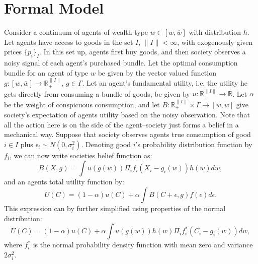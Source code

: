 \documentclass[a4paper,10pt]{article}
\begin{document}
\appendix
\section{Formal Model}
Consider a continuum of agents of wealth type $w\in[\underbar{w},\overline{w}]$ with distribution $h$.  Let agents have access to goods in the set $I$, $\|I\|<\infty$, with exogenously given prices $\{p_i\}_I$.  In this set up, agents first buy goods, and then society observes a noisy signal of each agent's purchased bundle.  Let the optimal consumption bundle for an agent of type $w$ be given by the vector valued function $g:[\underbar{w},\overline{w}]\rightarrow \mathbb{R}_+^{\|I\|}$, $g\in\Gamma$. Let an agent's fundamental utility, i.e. the utility he gets directly from consuming a bundle of goods, be given by $u:\mathbb{R}_+^{\|I\|}\rightarrow \mathbb{R}$.  Let $\alpha$ be the weight of conspicuous consumption, and let $B:\mathbb{R}_+^{\|I\|}\times \Gamma \rightarrow [\underbar{w},\overline{w}]$ give society's expectation of agents utility based on the noisy observation.  Note that all the action here is on the side of the agent--society just forms a belief in a mechanical way.  Suppose that society observes agents true consumption of good $i\in I$ plus $\epsilon_i \sim N(0,\sigma_i^2)$.  Denoting good $i$'s probability distribution function by $f_i$, we can now write societies belief function as:
\begin{equation}
 B(X,g) = \int u(g(w)) \Pi_i f_i(X_i - g_i(w)) h(w) dw, 
\end{equation}
and an agents total utility function by:
\[ 
 U(C) = (1-\alpha) u(C) + \alpha \int B(C+\epsilon,g) f(\epsilon) d\epsilon.
\]
This expression can by further simplified using properties of the normal distribution:
\begin{equation}
 U(C) = (1-\alpha) u(C) + \alpha \int u(g(w)) h(w) \Pi_i f_i^*(C_i-g_i(w)) dw,
\end{equation}
where $f_i^*$ is the normal probability density function with mean zero and variance $2\sigma_i^2$.
\end{document}
